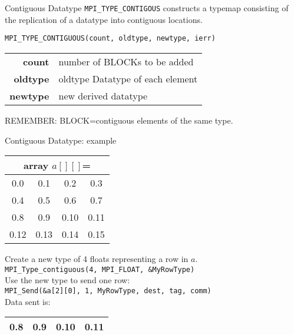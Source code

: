 \documentclass[aspectratio=43]{beamer}
\begin{document}
\begin{frame}[fragile]{Contiguous Datatype}
\verb+MPI_TYPE_CONTIGOUS+ constructs a typemap consisting of the replication of a datatype into contiguous locations.
\footnotesize
\begin{verbatim}
MPI_TYPE_CONTIGUOUS(count, oldtype, newtype, ierr)
\end{verbatim}
\vspace{-0.2cm}
\begin{black1block}{}
\begin{tabular}{rp{8cm}}
\textbf{count} & number of BLOCKs to be added\\
\textbf{oldtype} & oldtype Datatype of each element\\
\textbf{newtype} & new derived datatype\\
\end{tabular}
\end{black1block}
REMEMBER: BLOCK=contiguous elements of the same type.
\end{frame}

\begin{frame}[fragile]{Contiguous Datatype: example}
\begin{center}
\begin{tabular}{|c|c|c|c|}
    \multicolumn{4}{c}{array $a[][]$=}\\\hline
0.0  & 0.1  & 0.2  & 0.3\\\hline
0.4  & 0.5  & 0.6  & 0.7\\\hline
0.8  & 0.9  & 0.10 & 0.11\\\hline
0.12 & 0.13 & 0.14 & 0.15\\\hline
\end{tabular}
\end{center}
Create a new type of 4 floats representing a row in $a$.\\
\verb+MPI_Type_contiguous(4, MPI_FLOAT, &MyRowType)+\\[0.5cm]
Use the new type to send one row:\\
\verb+MPI_Send(&a[2][0], 1, MyRowType, dest, tag, comm)+\\[0.5cm]
Data sent is:
\begin{tabular}{|c|c|c|c|}
\hline
\color{cscsblue}0.8  & \color{cscsblue}0.9  & \color{cscsblue}0.10 & \color{cscsblue}0.11\\
\hline
\end{tabular}

\end{frame}
\end{document}
